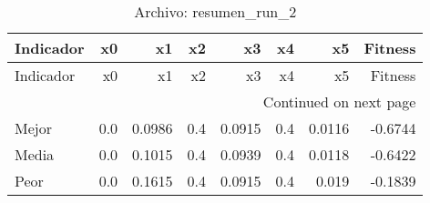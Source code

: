 \begin{longtable}{lrrrrrrr}
\caption{Archivo: resumen\_run\_2}\label{tab:resumen_run_2} \\
\toprule
Indicador & x0 & x1 & x2 & x3 & x4 & x5 & Fitness \\
\midrule
\endfirsthead
\toprule
Indicador & x0 & x1 & x2 & x3 & x4 & x5 & Fitness \\
\midrule
\endhead
\midrule
\multicolumn{8}{r}{Continued on next page} \\
\midrule
\endfoot
\bottomrule
\endlastfoot
Mejor & 0.0 & 0.0986 & 0.4 & 0.0915 & 0.4 & 0.0116 & -0.6744 \\
Media & 0.0 & 0.1015 & 0.4 & 0.0939 & 0.4 & 0.0118 & -0.6422 \\
Peor & 0.0 & 0.1615 & 0.4 & 0.0915 & 0.4 & 0.019 & -0.1839 \\
\end{longtable}